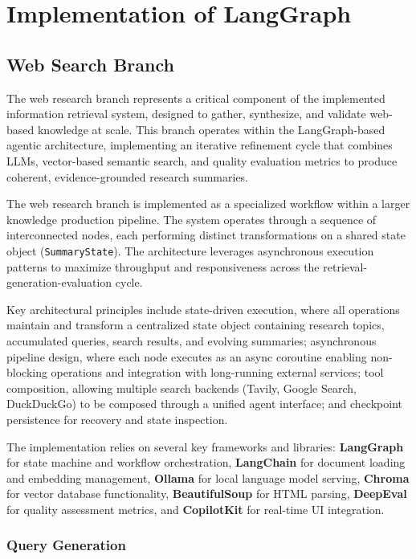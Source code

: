\section{Implementation of LangGraph}

\subsection{Web Search Branch}

The web research branch represents a critical component of the implemented information retrieval system, designed to gather, synthesize, and validate web-based knowledge at scale. This branch operates within the LangGraph-based agentic architecture, implementing an iterative refinement cycle that combines LLMs, vector-based semantic search, and quality evaluation metrics to produce coherent, evidence-grounded research summaries.

The web research branch is implemented as a specialized workflow within a larger knowledge production pipeline. The system operates through a sequence of interconnected nodes, each performing distinct transformations on a shared state object (\texttt{SummaryState}). The architecture leverages asynchronous execution patterns to maximize throughput and responsiveness across the retrieval-generation-evaluation cycle.

Key architectural principles include state-driven execution, where all operations maintain and transform a centralized state object containing research topics, accumulated queries, search results, and evolving summaries; asynchronous pipeline design, where each node executes as an async coroutine enabling non-blocking operations and integration with long-running external services; tool composition, allowing multiple search backends (Tavily, Google Search, DuckDuckGo) to be composed through a unified agent interface; and checkpoint persistence for recovery and state inspection.

The implementation relies on several key frameworks and libraries: \textbf{LangGraph} for state machine and workflow orchestration, \textbf{LangChain} for document loading and embedding management, \textbf{Ollama} for local language model serving, \textbf{Chroma} for vector database functionality, \textbf{BeautifulSoup} for HTML parsing, \textbf{DeepEval} for quality assessment metrics, and \textbf{CopilotKit} for real-time UI integration.

\subsubsection{Query Generation}

